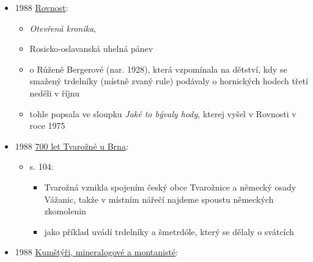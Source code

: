 \begin{itemize}
  \begin{itemize}
  \tightlist
  \item
    \emph{Strom života z Archlebova}, 
  \item
    Františka Poláčková, nar. 1926,  u Ždánic
  \item
    popis tradičního svatebního koláče -\/- strom života. Poláčková ho
    vytvořila na základě povídání starších sousedů
  \item
    při koláčovém povídání zavoněl trdelník stařenky předešlé generace
    pečený na loukoti (loukoť je součást dřevěnýho kola)
  \end{itemize}
\item
  1988
  \href{https://ndk.cz/uuid/uuid:bd7a25f0-4acf-11f0-b498-5ef3fc9bb22f}{Rovnost}:

  \begin{itemize}
  \tightlist
  \item
    \emph{Otevřená kronika}, 
  \item
    Rosicko-oslavanská uhelná pánev
  \item
    o Růženě Bergerové (nar. 1928), která vzpomínala na dětství, kdy se
    smažený trdelníky (místně zvaný rule) podávaly o hornických hodech
    třetí neděli v říjnu
  \item
     tohle popsala ve sloupku \emph{Jaké to
    bývaly hody}, kterej vyšel v Rovnosti v roce 1975
  \end{itemize}
\item
  1988
  \href{https://www.digitalniknihovna.cz/mzk/uuid/uuid:eb015670-8d7b-11ec-8353-005056827e51}{700
  let Tvarožné u Brna}:

  \begin{itemize}
  \tightlist
  \item
    s. 104:

    \begin{itemize}
    \tightlist
    \item
      Tvarožná vznikla spojením český obce Tvarožnice a německý osady
      Vážanic, takže v místním nářečí najdeme spoustu německých
      zkomolenin
    \item
      jako příklad uvádí trdelníky a šmetrdóle, který se dělaly o
      svátcích
    \end{itemize}
  \end{itemize}
\item
  1988
  \href{https://www.digitalniknihovna.cz/mzk/uuid/uuid:ad759030-1dfa-11e4-8f64-005056827e52}{Kumštýři,
  mineralogové a montanisté}:


\end{itemize}
